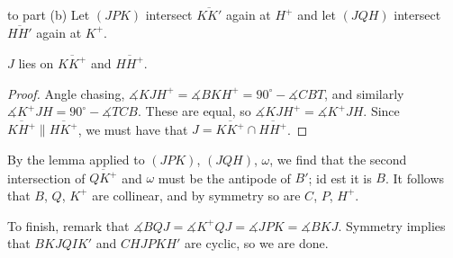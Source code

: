 \begin{customsol}{to part (b)}
    Let $(JPK)$ intersect $\overline{KK'}$ again at $H^+$ and let $(JQH)$ intersect $\overline{HH'}$ again at $K^+$.
    \begin{iclaim}
        $J$ lies on $\overline{KK^+}$ and $\overline{HH^+}$.
    \end{iclaim}
    \begin{proof}
        Angle chasing, $\measuredangle KJH^+=\measuredangle BKH^+=90^{\circ}-\measuredangle CBT$, and similarly $\measuredangle K^+JH=90^{\circ}-\measuredangle TCB$. These are equal, so $\measuredangle KJH^+=\measuredangle K^+JH$. Since $\overline{KH^+}\parallel\overline{HK^+}$, we must have that $J=\overline{KK^+}\cap\overline{HH^+}$.
    \end{proof}

    By the lemma applied to $(JPK)$, $(JQH)$, $\omega$, we find that the second intersection of $\overline{QK^+}$ and $\omega$ must be the antipode of $B'$; id est it is $B$. It follows that $B$, $Q$, $K^+$ are collinear, and by symmetry so are $C$, $P$, $H^+$.

    To finish, remark that $\measuredangle BQJ=\measuredangle K^+QJ=\measuredangle JPK=\measuredangle BKJ$. Symmetry implies that $BKJQIK'$ and $CHJPKH'$ are cyclic, so we are done.
\end{customsol}
\newpage


